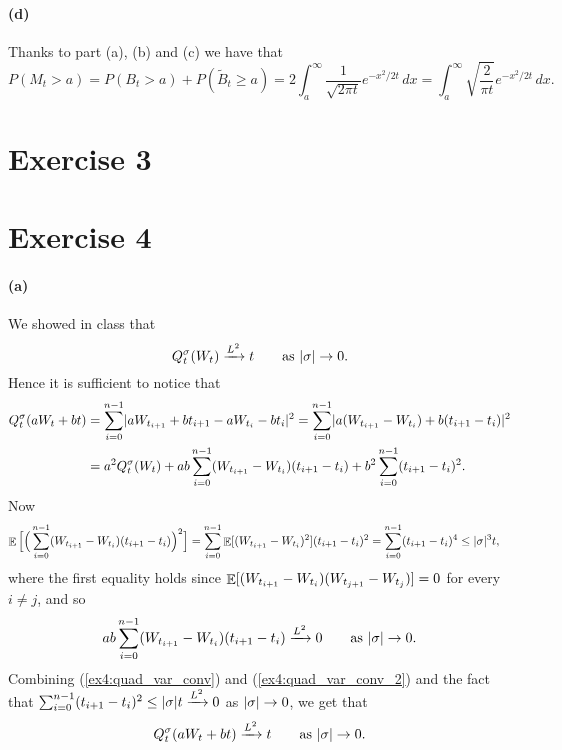 \documentclass[a4paper,11pt]{article}
\theoremstyle{definition}
\theoremstyle{plain}
\theoremstyle{remark}
\DeclarePairedDelimiter{\abs}{\lvert}{\rvert}
\DeclarePairedDelimiter{\parq}{[}{]}
\DeclareMathOperator*{\expval}{\mathbb{E}}
\begin{document}
\paragraph*{(d)}

Thanks to part (a), (b) and (c) we have that
$$
P(M_t>a) =  P(B_t>a) + P(\tilde{B}_t \geq a) = 2\int_a^\infty\frac{1}{\sqrt{2\pi t}}e^{-x^2/2t}\,dx = \int_a^\infty\sqrt{\frac{2}{\pi t}}e^{-x^2/2t}\,dx.
$$

\section*{Exercise 3}



\section*{Exercise 4}

\paragraph*{(a)}

We showed in class that
\begin{equation}\label{ex4:quad_var_conv}
Q_t^\sigma(W_t) \xrightarrow{L^2} t \qquad \text{as } \abs{\sigma}\to0.
\end{equation}
Hence it is sufficient to notice that
\begin{align*}
Q_t^\sigma(aW_t+bt) & = \sum_{i=0}^{n-1}\abs{aW_{t_{i+1}}+bt_{i+1}-aW_{t_i}-bt_i}^2 = \sum_{i=0}^{n-1}\abs{a(W_{t_{i+1}}-W_{t_i})+b(t_{i+1}-t_i)}^2 \\ & = a^2Q_t^\sigma(W_t) + ab\sum_{i=0}^{n-1}(W_{t_{i+1}}-W_{t_i})(t_{i+1}-t_i) + b^2\sum_{i=0}^{n-1}(t_{i+1}-t_i)^2.
\end{align*}
Now 
\begin{align*}
\expval\Big[\Big(\sum_{i=0}^{n-1}(W_{t_{i+1}}-W_{t_i})(t_{i+1}-t_i)\Big)^2\Big] & = \sum_{i=0}^{n-1}\expval\parq{(W_{t_{i+1}}-W_{t_i})^2}(t_{i+1}-t_i)^2 = \sum_{i=0}^{n-1}(t_{i+1}-t_i)^4 \leq \abs{\sigma}^3t,
\end{align*}
where the first equality holds since $\expval\parq{(W_{t_{i+1}}-W_{t_i})(W_{t_{j+1}}-W_{t_j})}=0$ for every $i\neq j$, and so
\begin{equation}\label{ex4:quad_var_conv_2}
ab\sum_{i=0}^{n-1}(W_{t_{i+1}}-W_{t_i})(t_{i+1}-t_i) \xrightarrow{L^2} 0 \qquad \text{as } \abs{\sigma}\to0.
\end{equation}
Combining (\ref{ex4:quad_var_conv}) and (\ref{ex4:quad_var_conv_2}) and the fact that $\sum_{i=0}^{n-1}(t_{i+1}-t_i)^2\leq\abs{\sigma}t\xrightarrow{L^2} 0$ as $\abs{\sigma}\to0$, we get that 
$$
Q_t^\sigma(aW_t+bt) \xrightarrow{L^2} t \qquad \text{as } \abs{\sigma}\to0.
$$
\end{document}
